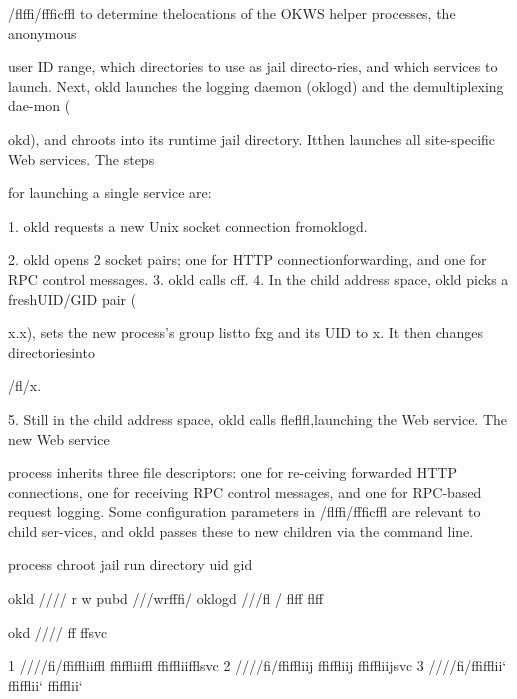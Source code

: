/flffi\Pi /\Xi fffi\Delta  \Pi \Xi \Psi c\Phi ffl to determine thelocations of the OKWS helper processes, the anonymous

user ID range, which directories to use as jail directo-ries, and which services to launch. Next, okld launches
the logging daemon (oklogd) and the demultiplexing dae-mon (

okd), and chroots into its runtime jail directory. Itthen launches all site-specific Web services. The steps

for launching a single service are:

1. okld requests a new Unix socket connection fromoklogd.

2. okld opens 2 socket pairs; one for HTTP connectionforwarding, and one for RPC control messages.
3. okld calls c\Xi \Theta ff.
4. In the child address space, okld picks a freshUID/GID pair (

x.x), sets the new process's group listto
fxg and its UID to x. It then changes directoriesinto

/\Pi \Xi \Theta fl\Delta /x.

5. Still in the child address space, okld calls flefl\Pi \Omega fl,launching the Web service. The new Web service

process inherits three file descriptors: one for re-ceiving forwarded HTTP connections, one for receiving RPC control messages, and one for RPC-based request logging. Some configuration parameters in /flffi\Pi /\Xi fffi\Delta  \Pi \Xi \Psi c\Phi ffl are relevant to child ser-vices, and okld passes these to new children via the
command line.

process chroot jail run directory uid gid

okld /\Gamma \Delta \Theta /\Lambda \Xi \Pi \Sigma /\Theta \Upsilon \Phi  / \Theta \Lambda \Lambda r \Pi w\Psi \Psi \Omega 
pubd /\Gamma \Delta \Theta /\Lambda \Xi \Pi \Sigma /wrff\Lambda fi\Sigma  / \Pi \Pi \Pi  \Pi \Pi \Pi 
oklogd /\Gamma \Delta \Theta /\Lambda \Xi \Pi \Sigma /\Omega \Lambda fl / \Lambda \Xi \Omega \Lambda flff \Lambda \Xi \Omega \Lambda flff

okd /\Gamma \Delta \Theta /\Lambda \Xi \Pi \Sigma /\Theta \Upsilon \Phi  / \Lambda \Xi ff \Lambda \Xi ffsvc

1 /\Gamma \Delta \Theta /\Lambda \Xi \Pi \Sigma /\Theta \Upsilon \Phi  /fi\Lambda \Theta \Psi \Sigma /ffiffliiffl ffiffliiffl ffiffliifflsvc
2 /\Gamma \Delta \Theta /\Lambda \Xi \Pi \Sigma /\Theta \Upsilon \Phi  /fi\Lambda \Theta \Psi \Sigma /ffiffliij ffiffliij ffiffliijsvc
3 /\Gamma \Delta \Theta /\Lambda \Xi \Pi \Sigma /\Theta \Upsilon \Phi  /fi\Lambda \Theta \Psi \Sigma /ffifflii` ffifflii` ffifflii`

